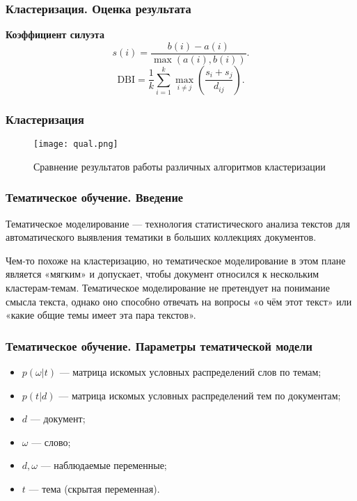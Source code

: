 \documentclass[notheorems, handout]{beamer}
\begin{document}
	\begin{frame}
	\frametitle{Кластеризация. Оценка результата}
	\textbf{Коэффициент силуэта} 
	$$s(i) = \frac{b(i) - a(i)}{\max(a(i), b(i))}.$$
	$$\text{DBI} = \frac{1}{k} \sum_{i=1}^{k} \max_{i \neq j} \left( \frac{s_i + s_j}{d_{ij}} \right).$$
	\end{frame}
	
		\begin{frame}
	\frametitle{Кластеризация}
	\begin{figure}[H]
	\begin{center}
		\texttt{[image: qual.png]}
		\caption{Сравнение результатов работы различных алгоритмов кластеризации}
	\end{center}
\end{figure}

	\end{frame}
	
	\begin{frame}
	\frametitle{Тематическое обучение. Введение}
	Тематическое моделирование --- технология статистического анализа текстов для автоматического выявления тематики в больших коллекциях документов.
	
	Чем-то похоже на кластеризацию, но тематическое моделирование в этом плане является «мягким» и допускает, чтобы документ относился к нескольким кластерам-темам. Тематическое моделирование не претендует на понимание смысла текста, однако оно способно отвечать на вопросы «о чём этот текст» или «какие общие темы имеет эта пара текстов».
	\end{frame}
	
	\begin{frame}
	\frametitle{Тематическое обучение. Параметры тематической модели }
	

	\begin{itemize}
	\item $p(\omega | t)$  --- матрица искомых условных распределений слов по темам;
	\item $p(t | d)$ --- матрица искомых условных распределений тем по документам;
	\item $d$ --- документ;
	\item $\omega$ --- слово;
	\item $d,\omega$  --- наблюдаемые переменные;
	\item $t$  --- тема (скрытая переменная).
\end{itemize}


	\end{frame}
	
\end{document}

